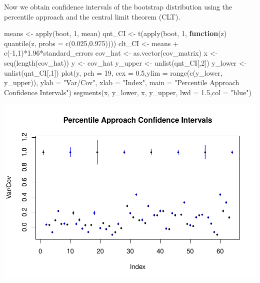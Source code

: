 \documentclass[
]{article}
\newenvironment{Shaded}{\begin{snugshade}}{\end{snugshade}}
\newcommand{\AttributeTok}[1]{\textcolor[rgb]{0.77,0.63,0.00}{#1}}
\newcommand{\ControlFlowTok}[1]{\textcolor[rgb]{0.13,0.29,0.53}{\textbf{#1}}}
\newcommand{\DecValTok}[1]{\textcolor[rgb]{0.00,0.00,0.81}{#1}}
\newcommand{\FloatTok}[1]{\textcolor[rgb]{0.00,0.00,0.81}{#1}}
\newcommand{\FunctionTok}[1]{\textcolor[rgb]{0.00,0.00,0.00}{#1}}
\newcommand{\NormalTok}[1]{#1}
\newcommand{\OtherTok}[1]{\textcolor[rgb]{0.56,0.35,0.01}{#1}}
\newcommand{\SpecialCharTok}[1]{\textcolor[rgb]{0.00,0.00,0.00}{#1}}
\newcommand{\StringTok}[1]{\textcolor[rgb]{0.31,0.60,0.02}{#1}}
\begin{document}
Now we obtain confidence intervals of the bootstrap distribution using
the percentile approach and the central limit theorem (CLT).

\begin{Shaded}
\begin{Highlighting}[]
\NormalTok{means }\OtherTok{\textless{}{-}} \FunctionTok{apply}\NormalTok{(boot, }\DecValTok{1}\NormalTok{, mean)}
\NormalTok{qnt\_CI }\OtherTok{\textless{}{-}} \FunctionTok{t}\NormalTok{(}\FunctionTok{apply}\NormalTok{(boot, }\DecValTok{1}\NormalTok{, }\ControlFlowTok{function}\NormalTok{(z) }\FunctionTok{quantile}\NormalTok{(z, }\AttributeTok{probs =} \FunctionTok{c}\NormalTok{(}\FloatTok{0.025}\NormalTok{,}\FloatTok{0.975}\NormalTok{))))}
\NormalTok{clt\_CI }\OtherTok{\textless{}{-}}\NormalTok{ means }\SpecialCharTok{+} \FunctionTok{c}\NormalTok{(}\SpecialCharTok{{-}}\DecValTok{1}\NormalTok{,}\DecValTok{1}\NormalTok{)}\SpecialCharTok{*}\FloatTok{1.96}\SpecialCharTok{*}\NormalTok{standard\_errors}
\NormalTok{cov\_hat }\OtherTok{\textless{}{-}} \FunctionTok{as.vector}\NormalTok{(cov\_matrix)}
\NormalTok{x }\OtherTok{\textless{}{-}} \FunctionTok{seq}\NormalTok{(}\FunctionTok{length}\NormalTok{(cov\_hat))}
\NormalTok{y }\OtherTok{\textless{}{-}}\NormalTok{ cov\_hat}
\NormalTok{y\_upper }\OtherTok{\textless{}{-}} \FunctionTok{unlist}\NormalTok{(qnt\_CI[,}\DecValTok{2}\NormalTok{])}
\NormalTok{y\_lower }\OtherTok{\textless{}{-}} \FunctionTok{unlist}\NormalTok{(qnt\_CI[,}\DecValTok{1}\NormalTok{])}
\FunctionTok{plot}\NormalTok{(y, }\AttributeTok{pch =} \DecValTok{19}\NormalTok{, }\AttributeTok{cex =} \FloatTok{0.5}\NormalTok{,}\AttributeTok{ylim =} \FunctionTok{range}\NormalTok{(}\FunctionTok{c}\NormalTok{(y\_lower, y\_upper)), }\AttributeTok{ylab =} \StringTok{"Var/Cov"}\NormalTok{, }\AttributeTok{xlab =} \StringTok{"Index"}\NormalTok{,}
     \AttributeTok{main =} \StringTok{"Percentile Approach Confidence Intervals"}\NormalTok{)}
\FunctionTok{segments}\NormalTok{(x, y\_lower, x, y\_upper, }\AttributeTok{lwd =} \FloatTok{1.5}\NormalTok{,}\AttributeTok{col =} \StringTok{"blue"}\NormalTok{)}
\end{Highlighting}
\end{Shaded}

\includegraphics{ANUASS2TEST_files/figure-latex/unnamed-chunk-8-1.pdf}
\end{document}
